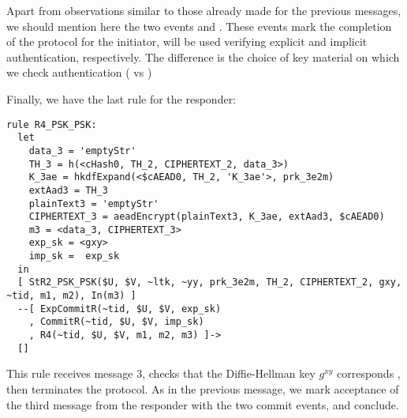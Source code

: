 Apart from observations similar to those already made for the previous messages,
we should mention here the two events %
 and . %
These events mark the completion of the protocol for the initiator,  will
be used  verifying explicit and implicit authentication, respectively.
The difference is the choice of key material on which we check authentication
( vs )

Finally, we have the last rule for the responder:
\begin{lstlisting}
rule R4_PSK_PSK:
  let
    data_3 = 'emptyStr' 
    TH_3 = h(<cHash0, TH_2, CIPHERTEXT_2, data_3>)
    K_3ae = hkdfExpand(<$cAEAD0, TH_2, 'K_3ae'>, prk_3e2m)
    extAad3 = TH_3
    plainText3 = 'emptyStr'
    CIPHERTEXT_3 = aeadEncrypt(plainText3, K_3ae, extAad3, $cAEAD0)
    m3 = <data_3, CIPHERTEXT_3>
    exp_sk = <gxy>
    imp_sk =  exp_sk
  in
  [ StR2_PSK_PSK($U, $V, ~ltk, ~yy, prk_3e2m, TH_2, CIPHERTEXT_2, gxy, ~tid, m1, m2), In(m3) ]
  --[ ExpCommitR(~tid, $U, $V, exp_sk)
    , CommitR(~tid, $U, $V, imp_sk)
    , R4(~tid, $U, $V, m1, m2, m3) ]->
  []
\end{lstlisting}

This rule receives message 3, checks  that the
Diffie-Hellman key $g^{xy}$ corresponds , then terminates the protocol.  As in
the previous message, we mark acceptance of the third message from the responder
with the two commit events, and conclude.

